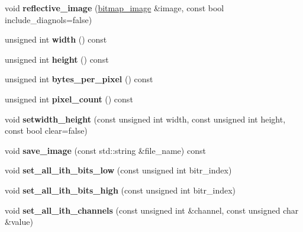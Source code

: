 \begin{DoxyCompactItemize}
\item 
\mbox{\label{classbitmap__image_a425b8c77d5e1efa8ffb74e5b060d40f2}} 
void {\bfseries reflective\+\_\+image} (\mbox{\hyperlink{classbitmap__image}{bitmap\+\_\+image}} \&image, const bool include\+\_\+diagnols=false)
\item 
\mbox{\label{classbitmap__image_a5b35164912c2442e0af3273d547fbce4}} 
unsigned int {\bfseries width} () const
\item 
\mbox{\label{classbitmap__image_a73fc78b71c064db2f6cd49622af50e6c}} 
unsigned int {\bfseries height} () const
\item 
\mbox{\label{classbitmap__image_a46f66c4f0ecc0212e9de2df0637cfb07}} 
unsigned int {\bfseries bytes\+\_\+per\+\_\+pixel} () const
\item 
\mbox{\label{classbitmap__image_a1eba5dd44c94cd071292517b329a5cc9}} 
unsigned int {\bfseries pixel\+\_\+count} () const
\item 
\mbox{\label{classbitmap__image_a834dde15b9d109cf8a34e11e998c781b}} 
void {\bfseries setwidth\+\_\+height} (const unsigned int width, const unsigned int height, const bool clear=false)
\item 
\mbox{\label{classbitmap__image_a91a6d527bf256efb81ba20432c20ce95}} 
void {\bfseries save\+\_\+image} (const std\+::string \&file\+\_\+name) const
\item 
\mbox{\label{classbitmap__image_ac9b633118f27d7b959f0a6f90e501008}} 
void {\bfseries set\+\_\+all\+\_\+ith\+\_\+bits\+\_\+low} (const unsigned int bitr\+\_\+index)
\item 
\mbox{\label{classbitmap__image_a318b8c1529ce668932dc5090e2798ffd}} 
void {\bfseries set\+\_\+all\+\_\+ith\+\_\+bits\+\_\+high} (const unsigned int bitr\+\_\+index)
\item 
\mbox{\label{classbitmap__image_a63836752e8e146ccde2e478b4d5290cd}} 
void {\bfseries set\+\_\+all\+\_\+ith\+\_\+channels} (const unsigned int \&channel, const unsigned char \&value)

\end{DoxyCompactItemize}
